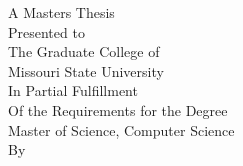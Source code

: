 \thispagestyle{empty}
  \doublespace
  \begin{center}
    \textbf{{\thesistitle}}

    A Masters Thesis\\
    Presented to\\
    The Graduate College of\\
    Missouri State University\\

    In Partial Fulfillment\\
    Of the Requirements for the Degree\\
    Master of Science, Computer Science\\
    By\\
    \thesisstudent\\
    \thesisdate
  \end{center}